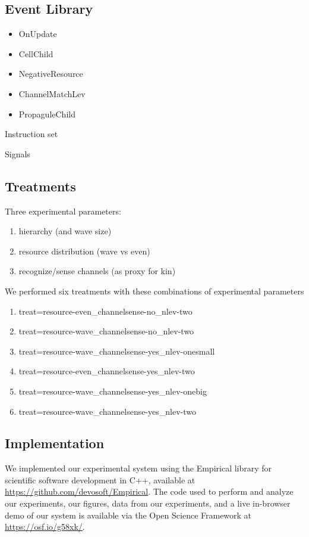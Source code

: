 \subsection{Event Library}

\begin{itemize}
\item OnUpdate
\item CellChild
\item NegativeResource
\item ChannelMatchLev
\item PropaguleChild
\end{itemize}

Instruction set

Signals

\subsection{Treatments}

Three experimental parameters:
\begin{enumerate}
\item hierarchy (and wave size)
\item resource distribution (wave vs even)
\item recognize/sense channels (as proxy for kin)
\end{enumerate}

We performed six treatments with these combinations of experimental parameters
\begin{enumerate}
\item treat=resource-even\_channelsense-no\_nlev-two
\item treat=resource-wave\_channelsense-no\_nlev-two
\item treat=resource-wave\_channelsense-yes\_nlev-onesmall
\item treat=resource-even\_channelsense-yes\_nlev-two
\item treat=resource-wave\_channelsense-yes\_nlev-onebig
\item treat=resource-wave\_channelsense-yes\_nlev-two
\end{enumerate}

\subsection{Implementation}

We implemented our experimental system using the Empirical library for scientific software development in C++, available at \url{https://github.com/devosoft/Empirical}.
The code used to perform and analyze our experiments, our figures, data from our experiments, and a live in-browser demo of our system is available via the Open Science Framework at \url{https://osf.io/g58xk/}.
